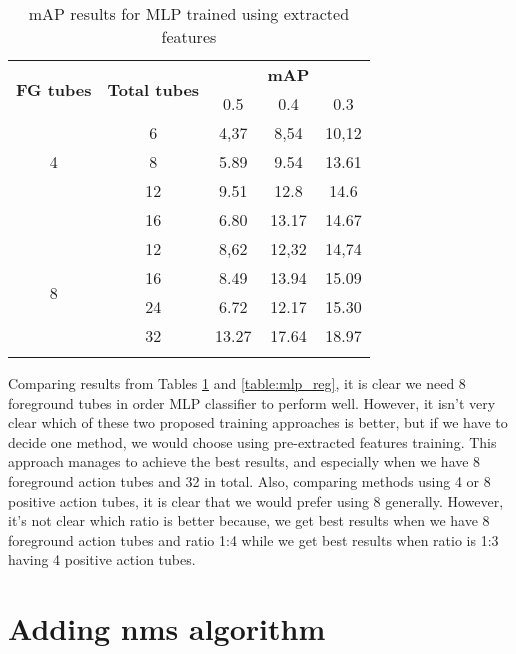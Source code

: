 \begin{center}
  \begin{longtable}{|| c | c || c c c ||}
    \hline
    \multirow{2}{*}{\textbf{FG tubes}} & \multirow{2}{*}{\textbf{Total tubes}} & {} & \textbf{mAP} & {} \\
    {} & {} & 0.5 & 0.4 & 0.3 \\
    \hline
    \multirow{3}{*}{4} & 6 & 4,37 & 8,54 & 10,12 \\
    \cline{2-5}
    {} & 8 & 5.89 & 9.54 & 13.61 \\
    \cline{2-5}
    {} & 12 & 9.51 & 12.8 & 14.6  \\
    \cline{2-5}
    {} & 16 & 6.80 & 13.17 & 14.67 \\
    \hline
    \multirow{4}{*}{8} & 12 & 8,62 & 12,32 & 14,74 \\
    \cline{2-5}
    {} & 16 & 8.49 & 13.94 & 15.09 \\
    \cline{2-5}
    {} & 24 & 6.72 & 12.17 & 15.30 \\
    \cline{2-5}
    {} & 32 & 13.27 & 17.64 & 18.97 \\
    \hline

  \caption{mAP results for MLP trained using extracted features}
  \label{table:mlp_extract_jhdmb}
\end{longtable}
\end{center}

Comparing results from Tables  \ref{table:mlp_extract_jhdmb}  and \ref{table:mlp_reg}, it is clear we need 8 foreground tubes in order MLP
classifier to perform well. However, it isn't very
clear which of these two proposed training approaches is better, but if we have to decide one method, we would choose using pre-extracted features training.  This approach manages
to achieve the best results, and especially when we have 8 foreground action tubes and 32 in total. Also, comparing methods using 4 or 8 positive action tubes, it is clear that we
would prefer using 8 generally. However, it's not clear which ratio is better because, we get best results when we have 8 foreground action tubes  and  ratio 1:4 while we get best results
when ratio is 1:3 having 4 positive action tubes.

\section{Adding nms algorithm}

